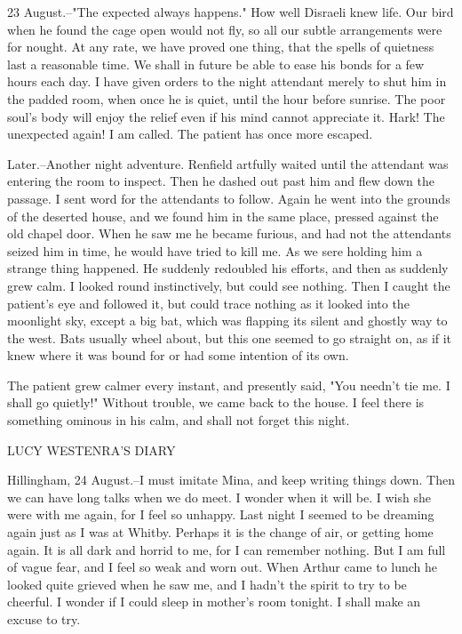23 August.--"The expected always happens." How well Disraeli knew life. Our bird when he found the cage open would not fly, so all our subtle arrangements were for nought. At any rate, we have proved one thing, that the spells of quietness last a reasonable time. We shall in future be able to ease his bonds for a few hours each day. I have given orders to the night attendant merely to shut him in the padded room, when once he is quiet, until the hour before sunrise. The poor soul's body will enjoy the relief even if his mind cannot appreciate it. Hark! The unexpected again! I am called. The patient has once more escaped. 

Later.--Another night adventure. Renfield artfully waited until the attendant was entering the room to inspect. Then he dashed out past him and flew down the passage. I sent word for the attendants to follow. Again he went into the grounds of the deserted house, and we found him in the same place, pressed against the old chapel door. When he saw me he became furious, and had not the attendants seized him in time, he would have tried to kill me. As we sere holding him a strange thing happened. He suddenly redoubled his efforts, and then as suddenly grew calm. I looked round instinctively, but could see nothing. Then I caught the patient's eye and followed it, but could trace nothing as it looked into the moonlight sky, except a big bat, which was flapping its silent and ghostly way to the west. Bats usually wheel about, but this one seemed to go straight on, as if it knew where it was bound for or had some intention of its own. 

The patient grew calmer every instant, and presently said, "You needn't tie me. I shall go quietly!" Without trouble, we came back to the house. I feel there is something ominous in his calm, and shall not forget this night. 

LUCY WESTENRA'S DIARY 

Hillingham, 24 August.--I must imitate Mina, and keep writing things down. Then we can have long talks when we do meet. I wonder when it will be. I wish she were with me again, for I feel so unhappy. Last night I seemed to be dreaming again just as I was at Whitby. Perhaps it is the change of air, or getting home again. It is all dark and horrid to me, for I can remember nothing. But I am full of vague fear, and I feel so weak and worn out. When Arthur came to lunch he looked quite grieved when he saw me, and I hadn't the spirit to try to be cheerful. I wonder if I could sleep in mother's room tonight. I shall make an excuse to try. 

